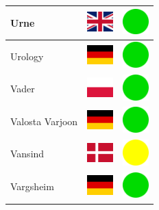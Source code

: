 \documentclass[12pt, a4paper, twoside]{report}
\begin{document}
\begin{center}
\begin{longtable}{|p{5cm}|p{2cm}|p{2cm}|}
 Urne                                                       & \includegraphics[width=1cm]{../img/flags/gb} &   \includegraphics[width=1cm]{../likes/y} \\ \hline
 Urology                                                    & \includegraphics[width=1cm]{../img/flags/de} &   \includegraphics[width=1cm]{../likes/y} \\ \hline
 Vader                                                      & \includegraphics[width=1cm]{../img/flags/pl} &   \includegraphics[width=1cm]{../likes/y} \\ \hline
 Valosta Varjoon                                            & \includegraphics[width=1cm]{../img/flags/de} &   \includegraphics[width=1cm]{../likes/y} \\ \hline
 Vansind                                                    & \includegraphics[width=1cm]{../img/flags/dk} &   \includegraphics[width=1cm]{../likes/m} \\ \hline
 Vargsheim                                                  & \includegraphics[width=1cm]{../img/flags/de} &   \includegraphics[width=1cm]{../likes/y} \\ \hline

\end{longtable}
\end{center}
\end{document}
